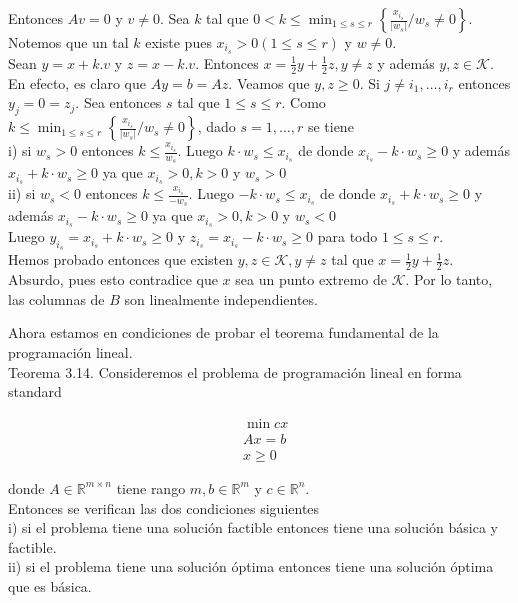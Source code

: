 \documentclass[10pt]{article}
\begin{document}
Entonces $A v=0$ y $v \neq 0$. Sea $k$ tal que $0<k \leq \min _{1 \leq s \leq r}\left\{\frac{x_{i_{s}}}{\left|w_{s}\right|} / w_{s} \neq 0\right\}$. Notemos que un tal $k$ existe pues $x_{i_{s}}>0(1 \leq s \leq r)$ y $w \neq 0$.\\
Sean $y=x+k . v$ y $z=x-k . v$. Entonces $x=\frac{1}{2} y+\frac{1}{2} z, y \neq z$ y además $y, z \in \mathcal{K}$. En efecto, es claro que $A y=b=A z$. Veamos que $y, z \geq 0$. Si $j \neq i_{1}, \ldots, i_{r}$ entonces $y_{j}=0=z_{j}$. Sea entonces $s$ tal que $1 \leq s \leq r$. Como $k \leq \min _{1 \leq s \leq r}\left\{\frac{x_{i_{s}}}{\left|w_{s}\right|} / w_{s} \neq 0\right\}$, dado $s=1, \ldots, r$ se tiene\\
i) si $w_{s}>0$ entonces $k \leq \frac{x_{i_{s}}}{w_{s}}$. Luego $k \cdot w_{s} \leq x_{i_{s}}$ de donde $x_{i_{s}}-k \cdot w_{s} \geq 0$ y además $x_{i_{s}}+k \cdot w_{s} \geq 0$ ya que $x_{i_{s}}>0, k>0$ y $w_{s}>0$\\
ii) si $w_{s}<0$ entonces $k \leq \frac{x_{i_{s}}}{-w_{s}}$. Luego $-k \cdot w_{s} \leq x_{i_{s}}$ de donde $x_{i_{s}}+k \cdot w_{s} \geq 0$ y además $x_{i_{s}}-k \cdot w_{s} \geq 0$ ya que $x_{i_{s}}>0, k>0$ y $w_{s}<0$\\
Luego $y_{i_{s}}=x_{i_{s}}+k \cdot w_{s} \geq 0$ y $z_{i_{s}}=x_{i_{s}}-k \cdot w_{s} \geq 0$ para todo $1 \leq s \leq r$.\\
Hemos probado entonces que existen $y, z \in \mathcal{K}, y \neq z$ tal que $x=\frac{1}{2} y+\frac{1}{2} z$. Absurdo, pues esto contradice que $x$ sea un punto extremo de $\mathcal{K}$. Por lo tanto, las columnas de $B$ son linealmente independientes.

Ahora estamos en condiciones de probar el teorema fundamental de la programación lineal.\\
Teorema 3.14. Consideremos el problema de programación lineal en forma standard

$$
\begin{aligned}
& \min c x \\
& A x=b \\
& x \geq 0
\end{aligned}
$$

donde $A \in \mathbb{R}^{m \times n}$ tiene rango $m, b \in \mathbb{R}^{m}$ y $c \in \mathbb{R}^{n}$.\\
Entonces se verifican las dos condiciones siguientes\\
i) si el problema tiene una solución factible entonces tiene una solución básica y factible.\\
ii) si el problema tiene una solución óptima entonces tiene una solución óptima que es básica.
\end{document}
